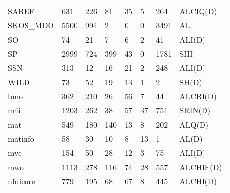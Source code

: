 \begin{table}
\begin{tabular}{m{3.5cm}m{1cm}m{1cm}m{1cm}m{1cm}m{1cm}m{1cm}m{1cm}}
SAREF                       &       631 &               226 &         81 &                   35 &                      5 &                      264 &         ALCIQ(D) \\
SKOS\_MDO                    &      5500 &               994 &          2 &                    0 &                      0 &                     3491 &               AL \\
SO                          &        74 &                21 &          7 &                    6 &                      2 &                       41 &           ALI(D) \\
SP                          &      2999 &               724 &        399 &                   43 &                      0 &                     1781 &              SHI \\
SSN                         &       313 &                12 &         16 &                   21 &                      2 &                      248 &           ALI(D) \\
WILD                        &        73 &                52 &         19 &                   13 &                      1 &                        2 &            SH(D) \\
bmo                         &       362 &               210 &         26 &                   56 &                      7 &                       44 &         ALCRI(D) \\
m4i                         &      1203 &               262 &         38 &                   57 &                     37 &                      751 &          SRIN(D) \\
mat                         &       549 &               180 &        140 &                   13 &                      8 &                      202 &           ALQ(D) \\
matinfo                     &        58 &                30 &         10 &                    8 &                     13 &                        1 &            AL(D) \\
mvc                         &       154 &                50 &         28 &                   12 &                      3 &                       75 &           ALI(D) \\
mwo                         &      1113 &               278 &        116 &                   74 &                     28 &                      557 &        ALCHIF(D) \\
nfdicore                    &       779 &               195 &         68 &                   67 &                      8 &                      445 &         ALCHI(D) \\

\end{tabular}
\end{table}
